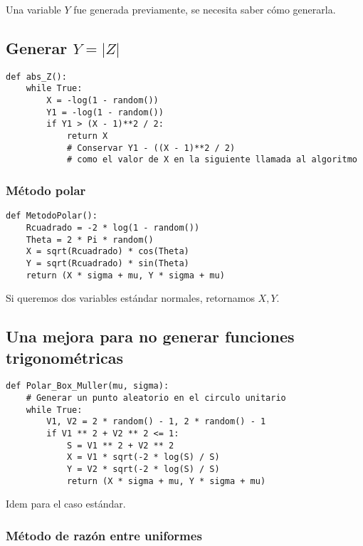 \documentclass[11pt, a4paper]{article}
\theoremstyle{definition}
\begin{document}
Una variable \(Y\) fue generada previamente, se necesita saber cómo generarla.

\subsection*{Generar \(Y = |Z|\)}

\begin{lstlisting}
def abs_Z():
    while True:
        X = -log(1 - random())
        Y1 = -log(1 - random())
        if Y1 > (X - 1)**2 / 2:
            return X
            # Conservar Y1 - ((X - 1)**2 / 2)
            # como el valor de X en la siguiente llamada al algoritmo
\end{lstlisting}

\subsubsection{Método polar}

\begin{lstlisting}
def MetodoPolar():
    Rcuadrado = -2 * log(1 - random())
    Theta = 2 * Pi * random()
    X = sqrt(Rcuadrado) * cos(Theta)
    Y = sqrt(Rcuadrado) * sin(Theta)
    return (X * sigma + mu, Y * sigma + mu)
\end{lstlisting}

Si queremos dos variables estándar normales, retornamos \(X, Y\).

\subsection*{Una mejora para no generar funciones trigonométricas}

\begin{lstlisting}
def Polar_Box_Muller(mu, sigma):
    # Generar un punto aleatorio en el circulo unitario
    while True:
        V1, V2 = 2 * random() - 1, 2 * random() - 1
        if V1 ** 2 + V2 ** 2 <= 1:
            S = V1 ** 2 + V2 ** 2
            X = V1 * sqrt(-2 * log(S) / S)
            Y = V2 * sqrt(-2 * log(S) / S)
            return (X * sigma + mu, Y * sigma + mu)
\end{lstlisting}

Idem para el caso estándar.

\newpage

\subsubsection{Método de razón entre uniformes}
\end{document}
